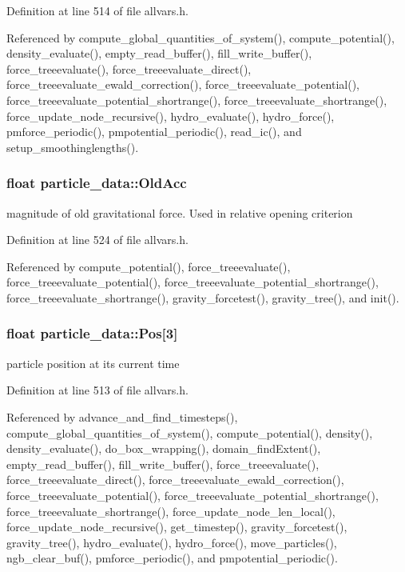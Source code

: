 Definition at line 514 of file allvars.h.



Referenced by compute\_\-global\_\-quantities\_\-of\_\-system(), compute\_\-potential(), density\_\-evaluate(), empty\_\-read\_\-buffer(), fill\_\-write\_\-buffer(), force\_\-treeevaluate(), force\_\-treeevaluate\_\-direct(), force\_\-treeevaluate\_\-ewald\_\-correction(), force\_\-treeevaluate\_\-potential(), force\_\-treeevaluate\_\-potential\_\-shortrange(), force\_\-treeevaluate\_\-shortrange(), force\_\-update\_\-node\_\-recursive(), hydro\_\-evaluate(), hydro\_\-force(), pmforce\_\-periodic(), pmpotential\_\-periodic(), read\_\-ic(), and setup\_\-smoothinglengths().

\hypertarget{structparticle__data_a5466aae28c06365368c9399c8f7cc02d}{
\subsubsection[{OldAcc}]{\setlength{\rightskip}{0pt plus 5cm}float {\bf particle\_\-data::OldAcc}}}
\label{structparticle__data_a5466aae28c06365368c9399c8f7cc02d}
magnitude of old gravitational force. Used in relative opening criterion 

Definition at line 524 of file allvars.h.



Referenced by compute\_\-potential(), force\_\-treeevaluate(), force\_\-treeevaluate\_\-potential(), force\_\-treeevaluate\_\-potential\_\-shortrange(), force\_\-treeevaluate\_\-shortrange(), gravity\_\-forcetest(), gravity\_\-tree(), and init().

\hypertarget{structparticle__data_a764ffe35d82a64065f585e3a84263dd1}{
\subsubsection[{Pos}]{\setlength{\rightskip}{0pt plus 5cm}float {\bf particle\_\-data::Pos}\mbox{[}3\mbox{]}}}
\label{structparticle__data_a764ffe35d82a64065f585e3a84263dd1}
particle position at its current time 

Definition at line 513 of file allvars.h.



Referenced by advance\_\-and\_\-find\_\-timesteps(), compute\_\-global\_\-quantities\_\-of\_\-system(), compute\_\-potential(), density(), density\_\-evaluate(), do\_\-box\_\-wrapping(), domain\_\-findExtent(), empty\_\-read\_\-buffer(), fill\_\-write\_\-buffer(), force\_\-treeevaluate(), force\_\-treeevaluate\_\-direct(), force\_\-treeevaluate\_\-ewald\_\-correction(), force\_\-treeevaluate\_\-potential(), force\_\-treeevaluate\_\-potential\_\-shortrange(), force\_\-treeevaluate\_\-shortrange(), force\_\-update\_\-node\_\-len\_\-local(), force\_\-update\_\-node\_\-recursive(), get\_\-timestep(), gravity\_\-forcetest(), gravity\_\-tree(), hydro\_\-evaluate(), hydro\_\-force(), move\_\-particles(), ngb\_\-clear\_\-buf(), pmforce\_\-periodic(), and pmpotential\_\-periodic().

